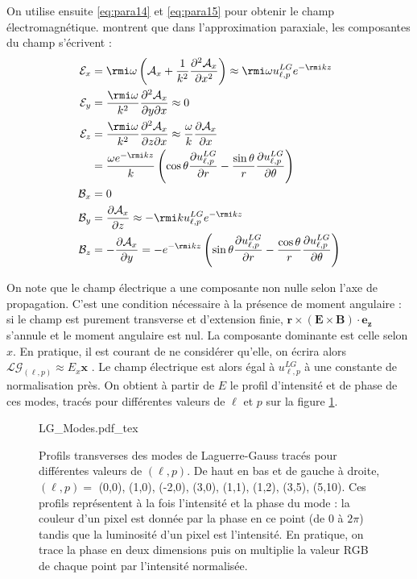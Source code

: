 On utilise ensuite \ref{eq:para14} et \ref{eq:para15} pour obtenir le champ électromagnétique.  montrent que dans l'approximation paraxiale, les composantes du champ s'écrivent :
\begin{align*}
\mathcal{E}_x &= \rmi \omega
\left(\mathcal{A}_x+\frac{1}{k^2}\frac{\partial^2 \mathcal{A}_x}{\partial x^2}\right)\approx \rmi\omega u^{LG}_{\ell,p}e^{-\rmi k z} \\
\mathcal{E}_y &= \frac{\rmi \omega}{k^2}
\frac{\partial^2 \mathcal{A}_x}{\partial y \partial x}\approx 0 \\
\mathcal{E}_z &= \frac{\rmi \omega}{k^2}
\frac{\partial^2 \mathcal{A}_x}{\partial z \partial x}\approx 
\frac{\omega}{k}\frac{\partial \mathcal{A}_x}{\partial x}\\
&= \frac{\omega e^{-\rmi k z}}{k}\left(\cos{\theta}\frac{\partial u^{LG}_{\ell,p}}{\partial r}-\frac{\sin \theta}{r} \frac{\partial u^{LG}_{\ell,p}}{\partial \theta}\right)\\
\mathcal{B}_x &= 0 \\
\mathcal{B}_y &= \frac{\partial \mathcal{A}_x}{\partial z} \approx -\rmi k u^{LG}_{\ell,p} e^{-\rmi k z}\\
\mathcal{B}_z &= -\frac{\partial \mathcal{A}_x}{\partial y}
=-e^{-\rmi k z}\left(\sin{\theta}\frac{\partial u^{LG}_{\ell,p}}{\partial r}-\frac{\cos \theta}{r} \frac{\partial u^{LG}_{\ell,p}}{\partial \theta}\right)\\
\end{align*}

On note que le champ électrique a une composante non nulle selon l'axe de propagation. C'est une condition nécessaire à la présence de moment angulaire : si le champ est purement transverse et d'extension finie, $\bm{r}\times(\bm{E}\times\bm{B})\cdot\bm{e_z}$ s'annule et le moment angulaire est nul. La composante dominante est celle selon $x$. En pratique, il est courant de ne considérer qu'elle, on écrira alors $\mathcal{LG}_{(\ell,p)} \approx E_x \bm{x}$ . Le champ électrique est alors égal à $u^{LG}_{\ell,p}$ à une constante de normalisation près. On obtient à partir de $E$ le profil d'intensité et de phase de ces modes,  tracés pour différentes valeurs de $\ell$ et $p$ sur la figure \ref{Fig:LGModes}.

\begin{figure}[!ht]
\centering
\def\svgwidth{\columnwidth}
{LG_Modes.pdf_tex}
\caption{Profils transverses des modes de Laguerre-Gauss tracés pour différentes valeurs de $(\ell,p)$. De haut en bas et de gauche à droite, $(\ell,p) =$ (0,0), (1,0), (-2,0), (3,0), (1,1), (1,2), (3,5), (5,10). Ces profils représentent à la fois l'intensité et la phase du mode : la couleur d'un pixel est donnée par la phase en ce point (de 0 à $2\pi$) tandis que la luminosité d'un pixel est l'intensité. En pratique, on trace la phase en deux dimensions puis on multiplie la valeur RGB de chaque point par l'intensité normalisée.}
\label{Fig:LGModes}
\end{figure}

